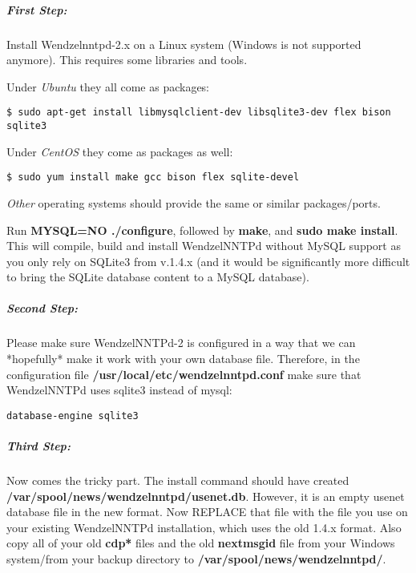 \documentclass[12pt,fleqn,leqno]{scrbook}
\begin{document}
\hypertarget{first-step}{%
\subparagraph*{First Step:}\label{first-step}}

Install Wendzelnntpd-2.x on a Linux system (Windows is not supported
anymore). This requires some libraries and tools.

Under \emph{Ubuntu} they all come as packages:

\begin{verbatim}
$ sudo apt-get install libmysqlclient-dev libsqlite3-dev flex bison sqlite3
\end{verbatim}

Under \emph{CentOS} they come as packages as well:

\begin{verbatim}
$ sudo yum install make gcc bison flex sqlite-devel
\end{verbatim}

\emph{Other} operating systems should provide the same or similar
packages/ports.

Run \textbf{MYSQL=NO ./configure}, followed by \textbf{make}, and
\textbf{sudo make install}. This will compile, build and install
WendzelNNTPd without MySQL support as you only rely on SQLite3 from
v.1.4.x (and it would be significantly more difficult to bring the
SQLite database content to a MySQL database).

\hypertarget{second-step}{%
\subparagraph*{Second Step:}\label{second-step}}

Please make sure WendzelNNTPd-2 is configured in a way that we can
*hopefully* make it work with your own database file. Therefore, in the
configuration file \textbf{/usr/local/etc/wendzelnntpd.conf} make sure
that WendzelNNTPd uses sqlite3 instead of mysql:

\begin{verbatim}
database-engine sqlite3
\end{verbatim}

\hypertarget{third-step}{%
\subparagraph*{Third Step:}\label{third-step}}

Now comes the tricky part. The install command should have created
\textbf{/var/spool/news/wendzelnntpd/usenet.db}. However, it is an empty
usenet database file in the new format. Now REPLACE that file with the
file you use on your existing WendzelNNTPd installation, which uses the
old 1.4.x format. Also copy all of your old \textbf{cdp*} files and the
old \textbf{nextmsgid} file from your Windows system/from your backup
directory to \textbf{/var/spool/news/wendzelnntpd/}.
\end{document}

